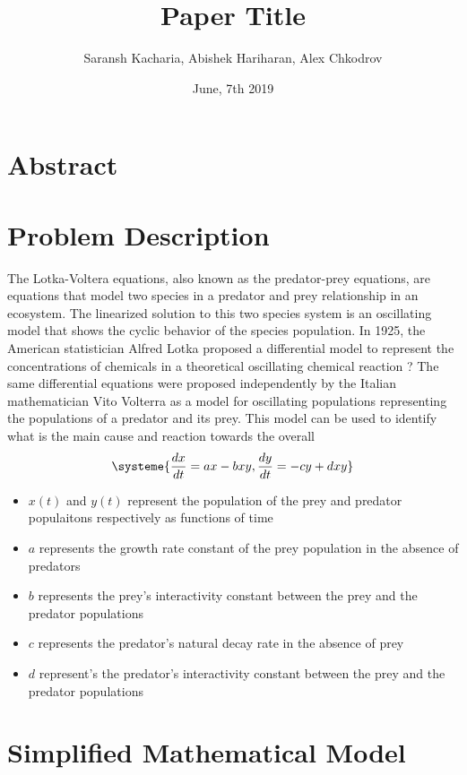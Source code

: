 \documentclass[11pt,oneside]{article}
\title{Paper Title}
\author{Saransh Kacharia, Abishek Hariharan, Alex Chkodrov}
\date{June, 7th 2019}
\begin{document}
	\maketitle
	\pagestyle{fancy}
	\section{Abstract}
	\section{Problem Description}
	The Lotka-Voltera equations, also known as the predator-prey equations, are equations that model two species in a predator and prey relationship in an ecosystem. The linearized solution to this two species system is an oscillating model that shows the cyclic behavior of the species population. In 1925, the American statistician Alfred Lotka proposed a differential model to represent the concentrations of chemicals in a theoretical oscillating chemical reaction ? The same differential equations were proposed independently by the Italian mathematician Vito Volterra as a model for oscillating populations representing the populations of a predator and its prey. This model can be used to identify what is the main cause and reaction towards the overall
	\begin{equation*}
	\systeme{
		\frac{dx}{dt} = ax - bxy,
		\frac{dy}{dt} = -cy + dxy
	}
	\end{equation*}
	\begin{itemize}
		\item $x(t)$ and $y(t)$ represent the population of the prey and predator populaitons respectively as functions of time
		\item $a$ represents the growth rate constant of the prey population in the absence of predators
		\item $b$ represents the prey's interactivity constant between the prey and the predator populations
		\item $c$ represents the predator's natural decay rate in the absence of prey
		\item $d$ represent's the predator's interactivity constant between the prey and the predator populations
	\end{itemize}
	
	
	\section{Simplified Mathematical Model}
	
\end{document}
